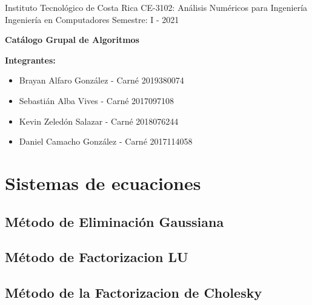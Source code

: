\documentclass[10pt]{article}
\begin{document}
Instituto Tecnológico de Costa Rica \hfill
CE-3102: Análisis Numéricos para Ingeniería\\
Ingeniería en Computadores \hfill 
Semestre: I - 2021\\




\begin{center}\textbf{\huge Catálogo Grupal de Algoritmos}  \end{center}

{\bf Integrantes: }
\begin{itemize}
\item Brayan Alfaro González - Carné 2019380074
\item Sebastián Alba Vives - Carné 2017097108 
\item Kevin Zeledón Salazar - Carné 2018076244 
\item Daniel Camacho González - Carné 2017114058
\end{itemize}


\section{Sistemas de ecuaciones}

\subsection{Método de Eliminación Gaussiana}



\newpage

\subsection{Método de Factorizacion LU}



\newpage

\subsection{Método de la Factorizacion de Cholesky}
\end{document}
